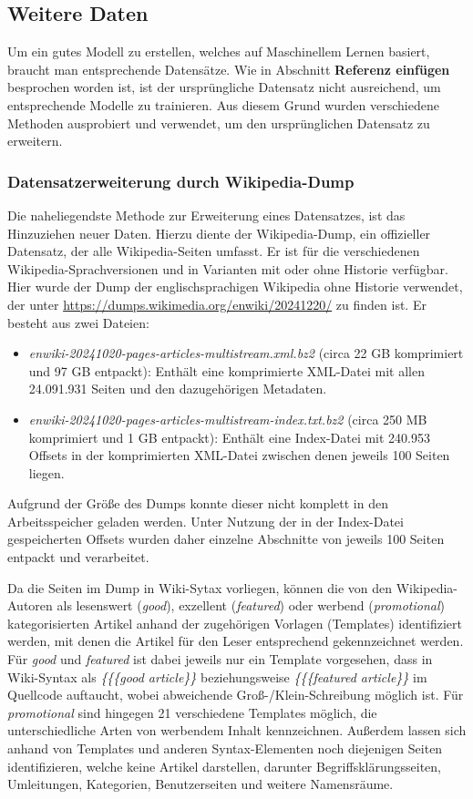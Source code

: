 \subsection{Weitere Daten}
Um ein gutes Modell zu erstellen, welches auf Maschinellem Lernen basiert, braucht man entsprechende Datensätze. Wie in Abschnitt \textbf{Referenz einfügen} besprochen worden ist, ist der ursprüngliche Datensatz nicht ausreichend, um entsprechende Modelle zu trainieren. Aus diesem Grund wurden verschiedene Methoden ausprobiert und verwendet, um den ursprünglichen Datensatz zu erweitern.

\subsubsection{Datensatzerweiterung durch Wikipedia-Dump}
\label{WPDump}
Die naheliegendste Methode zur Erweiterung eines Datensatzes, ist das Hinzuziehen neuer Daten. Hierzu diente der Wikipedia-Dump, ein offizieller Datensatz, der alle Wikipedia-Seiten umfasst. Er ist für die verschiedenen Wikipedia-Sprachversionen und in Varianten mit oder ohne Historie verfügbar. Hier wurde der Dump der englischsprachigen Wikipedia ohne Historie verwendet, der unter \url{https://dumps.wikimedia.org/enwiki/20241220/} zu finden ist. Er besteht aus zwei Dateien:

\begin{itemize}
    \item \emph{enwiki-20241020-pages-articles-multistream.xml.bz2} (circa 22 GB komprimiert und 97 GB entpackt): Enthält eine komprimierte XML-Datei mit allen 24.091.931 Seiten und den dazugehörigen Metadaten.
    \item \emph{enwiki-20241020-pages-articles-multistream-index.txt.bz2} (circa 250 MB komprimiert und 1 GB entpackt): Enthält eine Index-Datei mit 240.953 Offsets in der komprimierten XML-Datei zwischen denen jeweils 100 Seiten liegen.
\end{itemize}

Aufgrund der Größe des Dumps konnte dieser nicht komplett in den Arbeitsspeicher geladen werden. Unter Nutzung der in der Index-Datei gespeicherten Offsets wurden daher einzelne Abschnitte von jeweils 100 Seiten entpackt und verarbeitet.

Da die Seiten im Dump in Wiki-Sytax vorliegen, können die von den Wikipedia-Autoren als lesenswert (\emph{good}), exzellent (\emph{featured}) oder werbend (\emph{promotional}) kategorisierten Artikel anhand der zugehörigen Vorlagen (Templates) identifiziert werden, mit denen die Artikel für den Leser entsprechend gekennzeichnet werden. Für \emph{good} und \emph{featured} ist dabei jeweils nur ein Template vorgesehen, dass in Wiki-Syntax als \textit{\{\{\{good article\}\}} beziehungsweise \textit{\{\{\{featured article\}\}} im Quellcode auftaucht, wobei abweichende Groß-/Klein-Schreibung möglich ist. Für \emph{promotional} sind hingegen 21 verschiedene Templates möglich, die unterschiedliche Arten von werbendem Inhalt kennzeichnen. Außerdem lassen sich anhand von Templates und anderen Syntax-Elementen noch diejenigen Seiten identifizieren, welche keine Artikel darstellen, darunter Begriffsklärungsseiten, Umleitungen, Kategorien, Benutzerseiten und weitere Namensräume.

